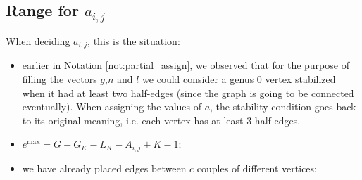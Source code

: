 \documentclass{amsart}
\theoremstyle{plain}
\theoremstyle{definition}
\DeclareMathOperator{\MAX}{max}
\begin{document}
\subsection{Range for $a_{i,j}$}

When deciding $a_{i,j}$, this is the situation:
\begin{itemize}
\item earlier in Notation \ref{not:partial_assign}, we observed that
  for the purpose of filling the vectors $g$,$n$ and $l$ we could
  consider a genus $0$ vertex stabilized when it had at least two
  half-edges (since the graph is going to be connected
  eventually). When assigning the values of $a$, the stability
  condition goes back to its original meaning, i.e. each vertex has at
  least $3$ half edges.
\item $e^{\MAX} = G - G_K - L_K - A_{i,j} + K - 1$;
\item we have already placed edges between $c$ couples of different
  vertices;
\end{itemize}
\end{document}

